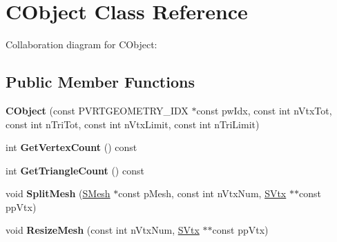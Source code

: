 \hypertarget{class_c_object}{\section{C\+Object Class Reference}
\label{class_c_object}
}


Collaboration diagram for C\+Object\+:
\subsection*{Public Member Functions}
\begin{DoxyCompactItemize}
\item 
\hypertarget{class_c_object_a68ac49aabdf36918d2f30a50b75bbe01}{{\bfseries C\+Object} (const P\+V\+R\+T\+G\+E\+O\+M\+E\+T\+R\+Y\+\_\+\+I\+D\+X $\ast$const pw\+Idx, const int n\+Vtx\+Tot, const int n\+Tri\+Tot, const int n\+Vtx\+Limit, const int n\+Tri\+Limit)}\label{class_c_object_a68ac49aabdf36918d2f30a50b75bbe01}

\item 
\hypertarget{class_c_object_a15ec40670ce7495ef953a52454255578}{int {\bfseries Get\+Vertex\+Count} () const }\label{class_c_object_a15ec40670ce7495ef953a52454255578}

\item 
\hypertarget{class_c_object_a4a22a650377c26c14c1840d3d747f4d1}{int {\bfseries Get\+Triangle\+Count} () const }\label{class_c_object_a4a22a650377c26c14c1840d3d747f4d1}

\item 
\hypertarget{class_c_object_a991b9079ddbd625037c411693615c2fa}{void {\bfseries Split\+Mesh} (\hyperlink{struct_s_mesh}{S\+Mesh} $\ast$const p\+Mesh, const int n\+Vtx\+Num, \hyperlink{struct_s_vtx}{S\+Vtx} $\ast$$\ast$const pp\+Vtx)}\label{class_c_object_a991b9079ddbd625037c411693615c2fa}

\item 
\hypertarget{class_c_object_aff81b80560a6f5469fd06a858386b691}{void {\bfseries Resize\+Mesh} (const int n\+Vtx\+Num, \hyperlink{struct_s_vtx}{S\+Vtx} $\ast$$\ast$const pp\+Vtx)}\label{class_c_object_aff81b80560a6f5469fd06a858386b691}

\end{DoxyCompactItemize}
